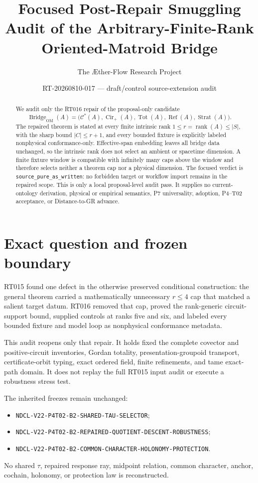 \documentclass[11pt]{article}
\title{Focused Post-Repair Smuggling Audit of the Arbitrary-Finite-Rank Oriented-Matroid Bridge}
\author{The \AE ther-Flow Research Project}
\date{RT-20260810-017 --- draft/control source-extension audit}
\newcommand{\Bridge}{\operatorname{Bridge}_{\mathrm{OM}}}
\newcommand{\Cstar}{\mathcal{C}^{*}}
\newcommand{\Cirp}{\operatorname{Cir}_{+}}
\begin{document}
\maketitle

\begin{abstract}
We audit only the RT016 repair of the proposal-only candidate
\[
 \Bridge(A)=\bigl(\Cstar(A),\Cirp(A),\operatorname{Tot}(A),
 \operatorname{Ref}(A),\operatorname{Strat}(A)\bigr).
\]
The repaired theorem is stated at every finite intrinsic rank
$1\le r=\operatorname{rank}(A)\le |S|$, with the sharp bound
$|C|\le r+1$, and every bounded fixture is explicitly labeled nonphysical
conformance-only.  Effective-span embedding leaves all bridge data unchanged,
so the intrinsic rank does not select an ambient or spacetime dimension.  A
finite fixture window is compatible with infinitely many caps above the
window and therefore selects neither a theorem cap nor a physical dimension.
The focused verdict is \texttt{source\_pure\_as\_written}: no forbidden target
or workflow import remains in the repaired scope.  This is only a local
proposal-level audit pass.  It supplies no current-ontology derivation,
physical or empirical semantics, P7 universality, adoption, P4--T02
acceptance, or Distance-to-GR advance.
\end{abstract}

\section{Exact question and frozen boundary}

RT015 found one defect in the otherwise preserved conditional construction:
the general theorem carried a mathematically unnecessary $r\le4$ cap that
matched a salient target datum.  RT016 removed that cap, proved the
rank-generic circuit-support bound, supplied controls at ranks five and six,
and labeled every bounded fixture and model loop as nonphysical conformance
metadata.

This audit reopens only that repair.  It holds fixed the complete covector and
positive-circuit inventories, Gordan totality, presentation-groupoid
transport, certificate-orbit typing, exact ordered field, finite refinements,
and tame exact-path domain.  It does not replay the full RT015 input audit or
execute a robustness stress test.

The inherited freezes remain unchanged:
\begin{itemize}[leftmargin=*]
  \item \texttt{NDCL-V22-P4T02-B2-SHARED-TAU-SELECTOR};
  \item \texttt{NDCL-V22-P4T02-B2-REPAIRED-QUOTIENT-DESCENT-ROBUSTNESS};
  \item \texttt{NDCL-V22-P4T02-B2-COMMON-CHARACTER-HOLONOMY-PROTECTION}.
\end{itemize}
No shared $\tau$, repaired response ray, midpoint relation, common character,
anchor, cochain, holonomy, or protection law is reconstructed.
\end{document}
